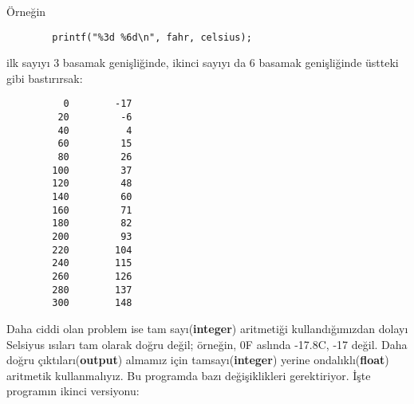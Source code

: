 \documentclass[a4paper,12pt,oneside]{book}
\begin{document}
Örneğin
\begin{lstlisting}
        printf("%3d %6d\n", fahr, celsius);
\end{lstlisting}
ilk sayıyı 3 basamak genişliğinde, ikinci sayıyı da 6 basamak genişliğinde üstteki gibi bastırırsak:
\begin{lstlisting}
          0        -17
         20         -6
         40          4
         60         15
         80         26
        100         37
        120         48
        140         60
        160         71
        180         82
        200         93
        220        104
        240        115
        260        126
        280        137
        300        148
\end{lstlisting}
\par Daha ciddi olan problem ise tam sayı(\textbf{integer}) aritmetiği kullandığımızdan dolayı Selsiyus ısıları tam olarak doğru değil; örneğin, 0\degree F aslında -17.8\degree C, -17 değil. Daha doğru çıktıları(\textbf{output}) almamız için tamsayı(\textbf{integer}) yerine ondalıklı(\textbf{float}) aritmetik kullanmalıyız. Bu programda bazı değişiklikleri gerektiriyor. İşte programın ikinci versiyonu: \pagebreak
\end{document}
